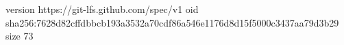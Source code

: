 version https://git-lfs.github.com/spec/v1
oid sha256:7628d82cffdbbcb193a3532a70cdf86a546e1176d8d15f5000c3437aa79d3b29
size 73
